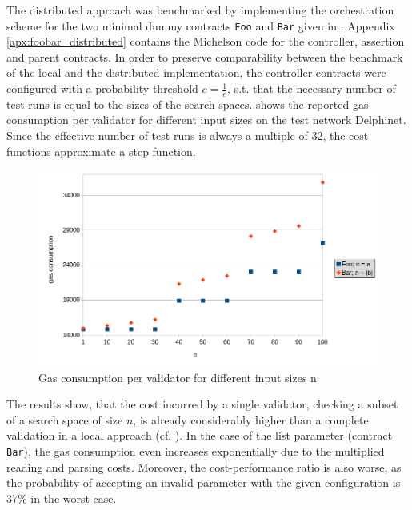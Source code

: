 The distributed approach was benchmarked by implementing the orchestration scheme for the two minimal dummy contracts \texttt{Foo} and \texttt{Bar} given in . Appendix \ref{apx:foobar_distributed} contains the Michelson code for the controller, assertion and parent contracts. In order to preserve comparability between the benchmark of the local and the distributed implementation, the controller contracts were configured with a probability threshold $c = \frac{1}{e}$, s.t. that the necessary number of test runs is equal to the sizes of the search spaces.  shows the reported gas consumption per validator for different input sizes on the test network Delphinet. Since the effective number of test runs is always a multiple of 32, the cost functions approximate a step function.  

\begin{figure}[t]
\centering
\includegraphics[width=\linewidth]{figures/5-offline_tezos/cost_analysis}
\caption{Gas consumption per validator for different input sizes n}
\label{fig:cost_distributed}
\end{figure}

The results show, that the cost incurred by a single validator, checking a subset of a search space of size $n$, is already considerably higher than a complete validation in a local approach (cf. ). In the case of the list parameter (contract \texttt{Bar}), the gas consumption even increases exponentially due to the multiplied reading and parsing costs. Moreover, the cost-performance ratio is also worse, as the probability of accepting an invalid parameter with the given configuration is 37\% in the worst case.

